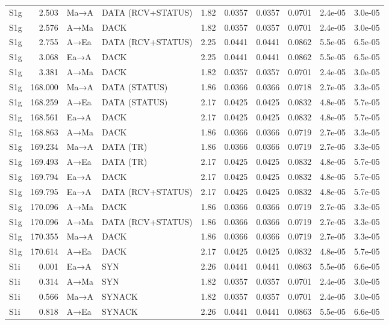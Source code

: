 \documentclass[10pt,letterpaper]{article}
\begin{document}
{\begin{longtable}{@{}lrllrrrrrr@{}}
S1g & 2.503 & Ma→A & DATA (RCV+STATUS) & 1.82 & 0.0357 & 0.0357 & 0.0701 & 2.4e-05 & 3.0e-05 \\
S1g & 2.576 & A→Ma & DACK & 1.82 & 0.0357 & 0.0357 & 0.0701 & 2.4e-05 & 3.0e-05 \\
S1g & 2.755 & A→Ea & DATA (RCV+STATUS) & 2.25 & 0.0441 & 0.0441 & 0.0862 & 5.5e-05 & 6.5e-05 \\
S1g & 3.068 & Ea→A & DACK & 2.25 & 0.0441 & 0.0441 & 0.0862 & 5.5e-05 & 6.5e-05 \\
S1g & 3.381 & A→Ma & DACK & 1.82 & 0.0357 & 0.0357 & 0.0701 & 2.4e-05 & 3.0e-05 \\
S1g & 168.000 & Ma→A & DATA (STATUS) & 1.86 & 0.0366 & 0.0366 & 0.0718 & 2.7e-05 & 3.3e-05 \\
S1g & 168.259 & A→Ea & DATA (STATUS) & 2.17 & 0.0425 & 0.0425 & 0.0832 & 4.8e-05 & 5.7e-05 \\
S1g & 168.561 & Ea→A & DACK & 2.17 & 0.0425 & 0.0425 & 0.0832 & 4.8e-05 & 5.7e-05 \\
S1g & 168.863 & A→Ma & DACK & 1.86 & 0.0366 & 0.0366 & 0.0719 & 2.7e-05 & 3.3e-05 \\
S1g & 169.234 & Ma→A & DATA (TR) & 1.86 & 0.0366 & 0.0366 & 0.0719 & 2.7e-05 & 3.3e-05 \\
S1g & 169.493 & A→Ea & DATA (TR) & 2.17 & 0.0425 & 0.0425 & 0.0832 & 4.8e-05 & 5.7e-05 \\
S1g & 169.794 & Ea→A & DACK & 2.17 & 0.0425 & 0.0425 & 0.0832 & 4.8e-05 & 5.7e-05 \\
S1g & 169.795 & Ea→A & DATA (RCV+STATUS) & 2.17 & 0.0425 & 0.0425 & 0.0832 & 4.8e-05 & 5.7e-05 \\
S1g & 170.096 & A→Ma & DACK & 1.86 & 0.0366 & 0.0366 & 0.0719 & 2.7e-05 & 3.3e-05 \\
S1g & 170.096 & A→Ma & DATA (RCV+STATUS) & 1.86 & 0.0366 & 0.0366 & 0.0719 & 2.7e-05 & 3.3e-05 \\
S1g & 170.355 & Ma→A & DACK & 1.86 & 0.0366 & 0.0366 & 0.0719 & 2.7e-05 & 3.3e-05 \\
S1g & 170.614 & A→Ea & DACK & 2.17 & 0.0425 & 0.0425 & 0.0832 & 4.8e-05 & 5.7e-05 \\
S1i & 0.001 & Ea→A & SYN & 2.26 & 0.0441 & 0.0441 & 0.0863 & 5.5e-05 & 6.6e-05 \\
S1i & 0.314 & A→Ma & SYN & 1.82 & 0.0357 & 0.0357 & 0.0701 & 2.4e-05 & 3.0e-05 \\
S1i & 0.566 & Ma→A & SYNACK & 1.82 & 0.0357 & 0.0357 & 0.0701 & 2.4e-05 & 3.0e-05 \\
S1i & 0.818 & A→Ea & SYNACK & 2.26 & 0.0441 & 0.0441 & 0.0863 & 5.5e-05 & 6.6e-05 \\

\end{longtable}}
\end{document}
